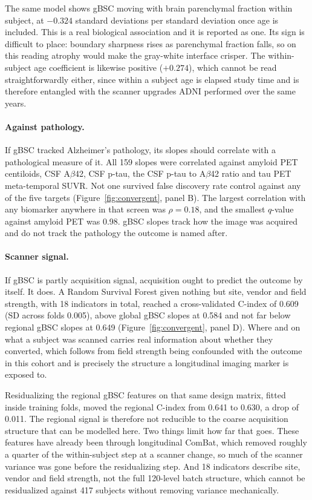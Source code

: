 \documentclass[blue]{ludusofficial}  %
\begin{document}
The same model shows gBSC moving with brain parenchymal fraction within subject, at $-0.324$ standard deviations per standard deviation once age is included. This is a real biological association and it is reported as one. Its sign is difficult to place: boundary sharpness rises as parenchymal fraction falls, so on this reading atrophy would make the gray-white interface crisper. The within-subject age coefficient is likewise positive ($+0.274$), which cannot be read straightforwardly either, since within a subject age is elapsed study time and is therefore entangled with the scanner upgrades ADNI performed over the same years.

\paragraph{Against pathology.} If gBSC tracked Alzheimer's pathology, its slopes should correlate with a pathological measure of it. All 159 slopes were correlated against amyloid PET centiloids, CSF A$\beta$42, CSF p-tau, the CSF p-tau to A$\beta$42 ratio and tau PET meta-temporal SUVR. Not one survived false discovery rate control against any of the five targets (Figure~\ref{fig:convergent}, panel B). The largest correlation with any biomarker anywhere in that screen was $\rho = 0.18$, and the smallest $q$-value against amyloid PET was 0.98. gBSC slopes track how the image was acquired and do not track the pathology the outcome is named after.

\paragraph{Scanner signal.} If gBSC is partly acquisition signal, acquisition ought to predict the outcome by itself. It does. A Random Survival Forest given nothing but site, vendor and field strength, with 18 indicators in total, reached a cross-validated C-index of 0.609 (SD across folds 0.005), above global gBSC slopes at 0.584 and not far below regional gBSC slopes at 0.649 (Figure~\ref{fig:convergent}, panel D). Where and on what a subject was scanned carries real information about whether they converted, which follows from field strength being confounded with the outcome in this cohort and is precisely the structure a longitudinal imaging marker is exposed to.

Residualizing the regional gBSC features on that same design matrix, fitted inside training folds, moved the regional C-index from 0.641 to 0.630, a drop of 0.011. The regional signal is therefore not reducible to the coarse acquisition structure that can be modelled here. Two things limit how far that goes. These features have already been through longitudinal ComBat, which removed roughly a quarter of the within-subject step at a scanner change, so much of the scanner variance was gone before the residualizing step. And 18 indicators describe site, vendor and field strength, not the full 120-level batch structure, which cannot be residualized against 417 subjects without removing variance mechanically.
\end{document}
